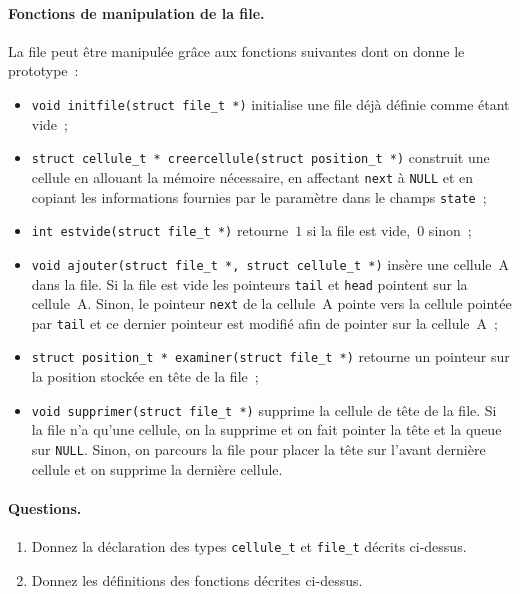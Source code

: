 \paragraph{Fonctions de manipulation de la file.}
La file peut \^etre manipul\'ee gr\^ace aux fonctions suivantes dont
on donne le prototype~:
\begin{itemize}
\item \verb?void initfile(struct file_t *)? initialise une file
  d\'ej\`a d\'efinie comme \'etant vide~;
\item \verb?struct cellule_t * creercellule(struct position_t *)?
  construit une cellule en allouant la m\'emoire n\'ecessaire, en
  affectant \texttt{next} \`a \texttt{NULL} et en copiant les
  informations fournies par le param\`etre dans le champs
  \texttt{state}~;
\item \verb?int estvide(struct file_t *)? retourne~$1$ si la file est
  vide,~$0$ sinon~;
\item \verb?void ajouter(struct file_t *, struct cellule_t *)?
  ins\`ere une cellule~A dans la file.  Si la file est vide les
  pointeurs \texttt{tail} et \texttt{head} pointent sur la cellule~A.
  Sinon, le pointeur \texttt{next} de la cellule~A pointe vers la
  cellule point\'ee par \texttt{tail} et ce dernier pointeur est
  modifi\'e afin de pointer sur la cellule~A~;
  \item \verb?struct position_t * examiner(struct file_t *)? retourne un
  pointeur sur la position stock\'ee en t\^ete de la file~;
\item \verb?void supprimer(struct file_t *)? supprime la cellule de
  t\^ete de la file.  Si la file n'a qu'une cellule, on la supprime et
  on fait pointer la t\^ete et la queue sur \texttt{NULL}. Sinon, on
  parcours la file pour placer la t\^ete sur l'avant derni\`ere
  cellule et on supprime la derni\`ere cellule.
\end{itemize}

\paragraph{Questions.}
\begin{enumerate}
\item Donnez la d\'eclaration des types \texttt{cellule\_t} et
  \texttt{file\_t} d\'ecrits ci-dessus.
\item Donnez les d\'efinitions des fonctions d\'ecrites ci-dessus.
\end{enumerate}

